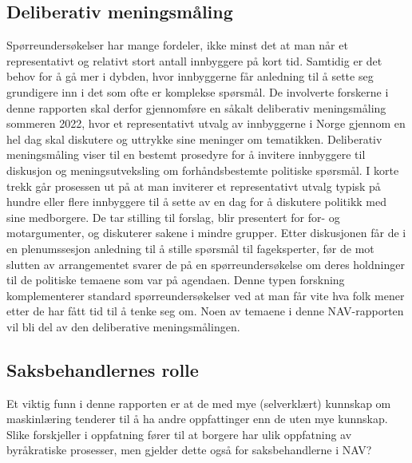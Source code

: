 \documentclass[
  12pt,
  a4paper, 12pt]{article}
\begin{document}
\hypertarget{deliberativ-meningsmuxe5ling}{%
\subsection{Deliberativ meningsmåling}\label{deliberativ-meningsmuxe5ling}}

Spørreundersøkelser har mange fordeler, ikke minst det at man når et representativt og relativt stort antall innbyggere på kort tid.
Samtidig er det behov for å gå mer i dybden, hvor innbyggerne får anledning til å sette seg grundigere inn i det som ofte er komplekse spørsmål.
De involverte forskerne i denne rapporten skal derfor gjennomføre en såkalt deliberativ meningsmåling sommeren 2022, hvor et representativt utvalg av innbyggerne i Norge gjennom en hel dag skal diskutere og uttrykke sine meninger om tematikken.
Deliberativ meningsmåling viser til en bestemt prosedyre for å invitere innbyggere til diskusjon og meningsutveksling om forhåndsbestemte politiske spørsmål.
I korte trekk går prosessen ut på at man inviterer et representativt utvalg typisk på hundre eller flere innbyggere til å sette av en dag for å diskutere politikk med sine medborgere.
De tar stilling til forslag, blir presentert for for- og motargumenter, og diskuterer sakene i mindre grupper.
Etter diskusjonen får de i en plenumssesjon anledning til å stille spørsmål til fageksperter, før de mot slutten av arrangementet svarer de på en spørreundersøkelse om deres holdninger til de politiske temaene som var på agendaen.
Denne typen forskning komplementerer standard spørreundersøkelser ved at man får vite hva folk mener etter de har fått tid til å tenke seg om.
Noen av temaene i denne NAV-rapporten vil bli del av den deliberative meningsmålingen.

\hypertarget{saksbehandlernes-rolle}{%
\subsection{Saksbehandlernes rolle}\label{saksbehandlernes-rolle}}

Et viktig funn i denne rapporten er at de med mye (selverklært) kunnskap om maskinlæring tenderer til å ha andre oppfattinger enn de uten mye kunnskap.
Slike forskjeller i oppfatning fører til at borgere har ulik oppfatning av byråkratiske prosesser, men gjelder dette også for saksbehandlerne i NAV?
\end{document}
